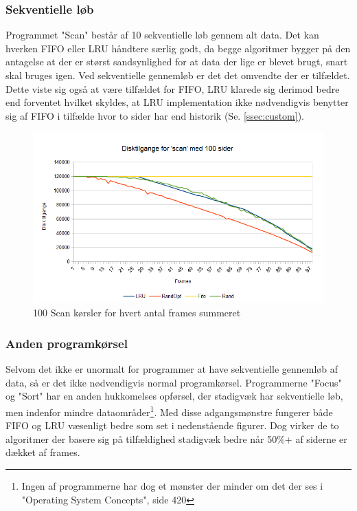 \subsubsection{Sekventielle løb}
Programmet "Scan" består af 10 sekventielle løb gennem alt data. Det kan hverken FIFO eller LRU håndtere særlig godt, da begge algoritmer bygger på den antagelse at der er størst sandsynlighed for at data der lige er blevet brugt, snart skal bruges igen. Ved sekventielle gennemløb er det det omvendte der er tilfældet. Dette viste sig også at være tilfældet for FIFO, LRU klarede sig derimod bedre end forventet hvilket skyldes, at LRU implementation ikke nødvendigvis benytter sig af FIFO i tilfælde hvor to sider har end historik (Se. \ref{ssec:custom}).

\begin{figure}[ht]
\centerline{\includegraphics[scale=0.8]{graph/stat_scan}}
\caption{100 Scan kørsler for hvert antal frames summeret}
\label{fig:scan}
\end{figure}

\subsubsection{Anden programkørsel}
Selvom det ikke er unormalt for programmer at have sekventielle gennemløb af data, så er det ikke nødvendigvis normal programkørsel. Programmerne "Focus" og "Sort" har en anden hukkomelses opførsel, der stadigvæk har sekventielle løb, men indenfor mindre dataområder\footnote{Ingen af programmerne har dog et mønster der minder om det der ses i "Operating System Concepts", side 420}. Med disse adgangsmønstre fungerer både FIFO og LRU væsenligt bedre som set i nedenstående figurer. Dog virker de to algoritmer der basere sig på tilfældighed stadigvæk bedre når 50\%+ af siderne er dækket af frames. 

